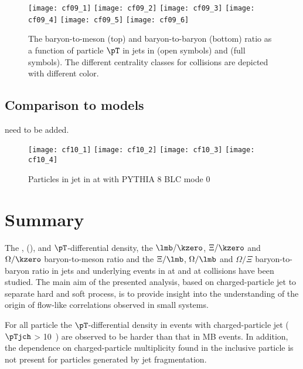 \documentclass[ALICE,manyauthors]{cernphprep}
\begin{document}
\begin{figure}[!ht]
	\begin{center}
		\texttt{[image: cf09\_1]}
		\texttt{[image: cf09\_2]}
		\texttt{[image: cf09\_3]}
		\texttt{[image: cf09\_4]}
		\texttt{[image: cf09\_5]}
		\texttt{[image: cf09\_6]}
	\end{center}
	\caption{The baryon-to-meson (top) and baryon-to-baryon (bottom) ratio as a function of particle $\pT$ in jets in \pp (open symbols) and \pPb (full symbols). The different centrality classes for \pPb collisions are depicted with different color.}
	\label{fig:pppPbRatio}
\end{figure}

\subsection{Comparison to models}
\label{subsec:ComToMod}

need to be added.

\begin{figure}[!ht]
	\begin{center}
		\texttt{[image: cf10\_1]}
		\texttt{[image: cf10\_2]}
		\texttt{[image: cf10\_3]}
		\texttt{[image: cf10\_4]}

	\end{center}
	\caption{Particles in jet in \pPb at \fivenn with PYTHIA 8 BLC mode 0}
	\label{fig:pPbpyJESpect}
\end{figure}


\clearpage
\section{Summary}%
\label{sec:Summary}

The \kzero, \lmb (\almb), \Xis and \Oms $\pT$-differential density, the $\lmb/\kzero$, $\Xi/\kzero$ and $\Omega/\kzero$ baryon-to-meson ratio and the $\Xi/\lmb$, $\Omega/\lmb$ and $\Omega/\Xi$ baryon-to-baryon ratio in jets and underlying events in \pp at \thirteen and \pPb at \fivenn collisions have been studied.
The main aim of the presented analysis, based on charged-particle jet to separate hard and soft process, is to provide insight into the understanding of the origin of flow-like correlations observed in small systems.

For all particle the $\pT$-differential density in events with charged-particle jet ($\pTjch$ > 10~\GeVc) are observed to be harder than that in MB events.
In addition, the dependence on charged-particle multiplicity found in the inclusive particle is not present for particles generated by jet fragmentation.
\end{document}
